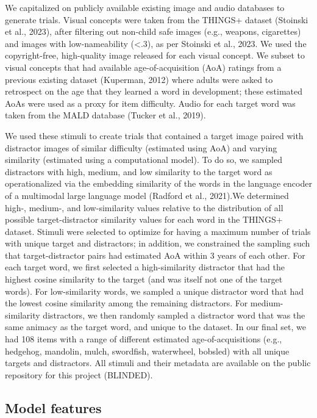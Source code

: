 \documentclass[
  man,mask]{apa6}
\begin{document}
We capitalized on publicly available existing image and audio databases to generate trials. Visual concepts were taken from the THINGS+ dataset (Stoinski et al., 2023), after filtering out non-child safe images (e.g., weapons, cigarettes) and images with low-nameability (\textless.3), as per Stoinski et al., 2023. We used the copyright-free, high-quality image released for each visual concept. We subset to visual concepts that had available age-of-acquisition (AoA) ratings from a previous existing dataset (Kuperman, 2012) where adults were asked to retrospect on the age that they learned a word in development; these estimated AoAs were used as a proxy for item difficulty. Audio for each target word was taken from the MALD database (Tucker et al., 2019).

We used these stimuli to create trials that contained a target image paired with distractor images of similar difficulty (estimated using AoA) and varying similarity (estimated using a computational model). To do so, we sampled distractors with high, medium, and low similarity to the target word as operationalized via the embedding similarity of the words in the language encoder of a multimodal large language model (Radford et al., 2021).We determined high-, medium-, and low-similarity values relative to the distribution of all possible target-distractor similarity values for each word in the THINGS+ dataset. Stimuli were selected to optimize for having a maximum number of trials with unique target and distractors; in addition, we constrained the sampling such that target-distractor pairs had estimated AoA within 3 years of each other. For each target word, we first selected a high-similarity distractor that had the highest cosine similarity to the target (and was itself not one of the target words). For low-similarity words, we sampled a unique distractor word that had the lowest cosine similarity among the remaining distractors. For medium-similarity distractors, we then randomly sampled a distractor word that was the same animacy as the target word, and unique to the dataset. In our final set, we had 108 items with a range of different estimated age-of-acquisitions (e.g., hedgehog, mandolin, mulch, swordfish, waterwheel, bobsled) with all unique targets and distractors. All stimuli and their metadata are available on the public repository for this project (BLINDED).

\subsection{Model features}\label{model-features}
\end{document}
